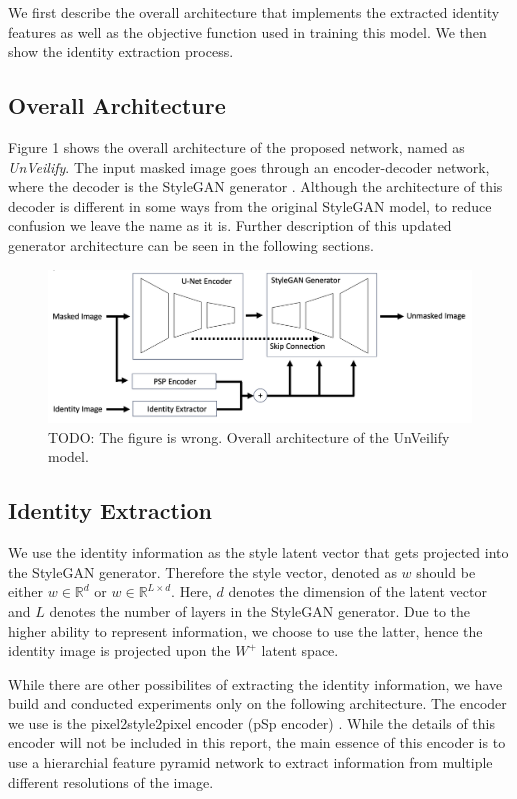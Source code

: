 \documentclass[sigconf]{acmart}
\begin{document}
We first describe the overall architecture that implements the extracted identity features as well as the objective function used in training this model. We then show the identity extraction process.


\subsection{Overall Architecture}
Figure 1 shows the overall architecture of the proposed network, named as \emph{UnVeilify}. The input
masked image goes through an encoder-decoder network, where the decoder is the StyleGAN generator
\cite{StyleGAN}. Although the architecture of this decoder is different in some ways from the
original StyleGAN model, to reduce confusion we leave the name as it is. Further description of this
updated generator architecture can be seen in the following sections.

\begin{figure}[h]
  \centering
  \includegraphics[width=\linewidth]{images/model-architecture.png}
  \caption{TODO: The figure is wrong. Overall architecture of the UnVeilify model.}
\end{figure}


\subsection{Identity Extraction}
We use the identity information as the style latent vector that gets projected 
into the StyleGAN generator. Therefore the style vector, denoted as $w$ should be
either $w\in\mathbb{R}^{d}$ or $w\in\mathbb{R}^{L\times d}$. Here, $d$ denotes the
dimension of the latent vector and $L$ denotes the number of layers in the StyleGAN
generator. Due to the higher ability to represent information, we choose to use the
latter, hence the identity image is projected upon the $\mathit{W}^{+}$ latent space.

While there are other possibilites of extracting the identity information, we have
build and conducted experiments only on the following architecture. The encoder we use
is the pixel2style2pixel encoder (pSp encoder) \cite{PSP}. While the details of this
encoder will not be included in this report, the main essence of this encoder is to use
a hierarchial feature pyramid network to extract information from multiple different resolutions
of the image.
\end{document}
